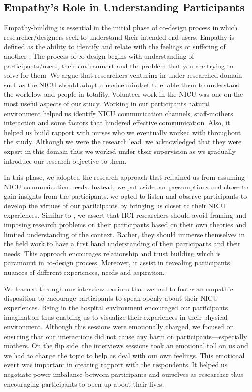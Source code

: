 \subsection{ Empathy's Role in Understanding Participants}
Empathy-building is essential in the initial phase of co-design process in which researcher/designers seek to understand their intended end-users. Empathy is defined as the ability to identify and relate with the feelings or suffering of another \citep{Bennett2019}.  The process of co-design begins with understanding of participants/users, their environment and the problem that you are trying to solve for them. We argue that researchers venturing in under-researched domain such as the NICU should adopt a novice mindset to enable them to understand the workflow and people in totality. Volunteer work in the NICU was one on the most useful aspects of our study. Working in our participants natural environment helped us identify NICU communication channels, staff-mothers interaction and some factors that hindered effective communication. Also, it helped us build rapport with nurses who we eventually worked with throughout the study. Although we were the research lead, we acknowledged that they were expert in this domain thus we worked under their supervision as we gradually introduce our research objective to them. 

In this phase, we adopted the research approach that refrained us from assuming NICU communication needs. Instead, we  put aside our presumptions and chose to gain insights from the participants. we opted to listen and observe participants to develop the virtues of our participants by bringing us closer to their NICU experiences. Similar to \citep{Taylor2011}, we assert that HCI researchers should avoid framing and imposing research problems on their participants based on their own theories and limited understanding of the context. Rather, they should immerse themselves in the field work to have a first hand understanding of their participants and their needs. This approach encourages relationship and trust building which is paramount in co-design process. Moreover, it assist in revealing participants nuances of different experiences, needs and aspiration. 

We learned through our interview sessions that we had to foster an empathic disposition to encourage participants to speak openly about their NICU experiences. Being in the hospital environment encouraged our participants imagination thus enabling us to visualize their experiences in their physical environment. Although this sessions were emotionally charged, we focused on ensuring that our interactions did not cause any harm on participants---especially mothers. On the flip side, the interviews sessions took an emotional toll on us and we had to change the topic to help us deal with our own feelings. This emotional event was important in creating rapport with the respondents. It helped us negotiate power imbalance between participants and ourselves as researcher thus encouraging participants to open up about their lives. 

